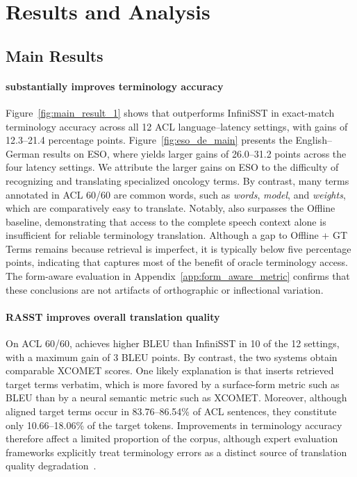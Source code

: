
\section{Results and Analysis}




\subsection{Main Results}

\paragraph{\method substantially improves terminology accuracy}
Figure~\ref{fig:main_result_1} shows that \method outperforms InfiniSST in exact-match terminology accuracy across all 12 ACL language--latency settings, with gains of 12.3--21.4 percentage points. Figure~\ref{fig:eso_de_main} presents the English--German results on ESO, where \method yields larger gains of 26.0--31.2 points across the four latency settings. We attribute the larger gains on ESO to the difficulty of recognizing and translating specialized oncology terms. By contrast, many terms annotated in ACL 60/60 are common words, such as \emph{words}, \emph{model}, and \emph{weights}, which are comparatively easy to translate. Notably, \method also surpasses the Offline baseline, demonstrating that access to the complete speech context alone is insufficient for reliable terminology translation. Although a gap to Offline + GT Terms remains because retrieval is imperfect, it is typically below five percentage points, indicating that \method captures most of the benefit of oracle terminology access. The form-aware evaluation in Appendix~\ref{app:form_aware_metric} confirms that these conclusions are not artifacts of orthographic or inflectional variation.

\paragraph{RASST improves overall translation quality}
On ACL 60/60, \method achieves higher BLEU than InfiniSST in 10 of the 12 settings, with a maximum gain of 3 BLEU points. By contrast, the two systems obtain comparable XCOMET scores. One likely explanation is that \method inserts retrieved target terms verbatim, which is more favored by a surface-form metric such as BLEU than by a neural semantic metric such as XCOMET. Moreover, although aligned target terms occur in 83.76--86.54\% of ACL sentences, they constitute only 10.66--18.06\% of the target tokens. Improvements in terminology accuracy therefore affect a limited proportion of the corpus, although expert evaluation frameworks explicitly treat terminology errors as a distinct source of translation quality degradation~\citep{freitag-etal-2021-experts}.

